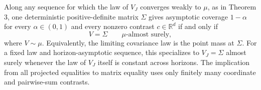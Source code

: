 Along any sequence for which the law of \(V_J\) converges weakly to \(\mu\), as in Theorem 3, one deterministic positive-definite matrix \(\Sigma\) gives asymptotic coverage \(1-\alpha\) for every \(\alpha\in(0,1)\) and every nonzero contrast \(c\in\mathbb R^d\) if and only if
\[
 V=\Sigma\qquad\mu\text{-almost surely},
\]
where \(V\sim\mu\). Equivalently, the limiting covariance law is the point mass at \(\Sigma\). For a fixed law and horizon-asymptotic sequence, this specializes to \(V_J=\Sigma\) almost surely whenever the law of \(V_J\) itself is constant across horizons. The implication from all projected equalities to matrix equality uses only finitely many coordinate and pairwise-sum contrasts.